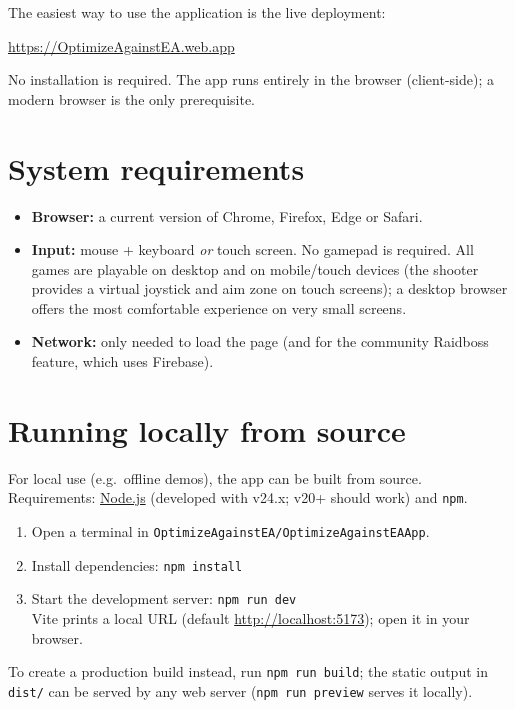 \documentclass[11pt,a4paper]{report}
\begin{document}
The easiest way to use the application is the live deployment:

\begin{center}
  \large\url{https://OptimizeAgainstEA.web.app}
\end{center}

No installation is required. The app runs entirely in the browser
(client-side); a modern browser is the only prerequisite.

\section{System requirements}

\begin{itemize}
  \item \textbf{Browser:} a current version of Chrome, Firefox, Edge or Safari.
  \item \textbf{Input:} mouse + keyboard \emph{or} touch screen. No gamepad
        is required. All games are playable on desktop and on mobile/touch
        devices (the shooter provides a virtual joystick and aim zone on
        touch screens); a desktop browser offers the most comfortable
        experience on very small screens.
  \item \textbf{Network:} only needed to load the page (and for the
        community Raidboss feature, which uses Firebase).
\end{itemize}

\section{Running locally from source}

For local use (e.g.\ offline demos), the app can be built from source.
Requirements: \href{https://nodejs.org/}{Node.js} (developed with v24.x;
v20+ should work) and \texttt{npm}.

\begin{enumerate}
  \item Open a terminal in \texttt{OptimizeAgainstEA/OptimizeAgainstEAApp}.
  \item Install dependencies: \texttt{npm install}
  \item Start the development server: \texttt{npm run dev}\\
        Vite prints a local URL (default \url{http://localhost:5173});
        open it in your browser.
\end{enumerate}

To create a production build instead, run \texttt{npm run build}; the static
output in \texttt{dist/} can be served by any web server
(\texttt{npm run preview} serves it locally).
\end{document}
